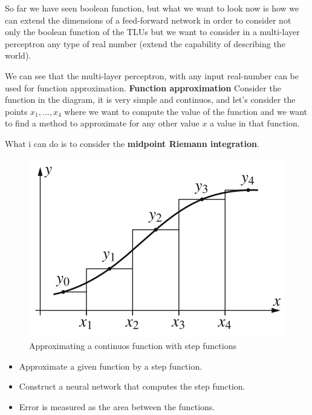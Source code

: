 \documentclass{article}
\begin{document}
So far we have seen boolean function, but what we want to look now is how we can extend
the dimensions of a feed-forward network in order to consider not only
the boolean function of the TLUs but we want to consider in a multi-layer
perceptron any type of real number (extend the capability of describing the world).

We can see that the multi-layer perceptron,
with any input real-number can be used for function approximation.
\newline\newline\noindent\textbf{Function approximation}\newline
Consider the function in the diagram, it is very simple and continuos,
and let's consider the points $x_1,...,x_4$ where we want to compute
the value of the function and we want to find a method to approximate for any other value
$x$ a value in that function.

What i can do is to consider the \textbf{midpoint Riemann integration}.

\begin{figure}
    \centering
    \includegraphics[scale=0.5]{images/midpoint_integra.png}
    \caption{Approximating a continuos function with step functions}
    \label{fig:midpoint_int}
\end{figure}

\begin{itemize}
    \item Approximate a given function by a step function.
    \item Construct a neural network that computes the step function.
    \item Error is measured as the area between the functions.
\end{itemize}
\end{document}
